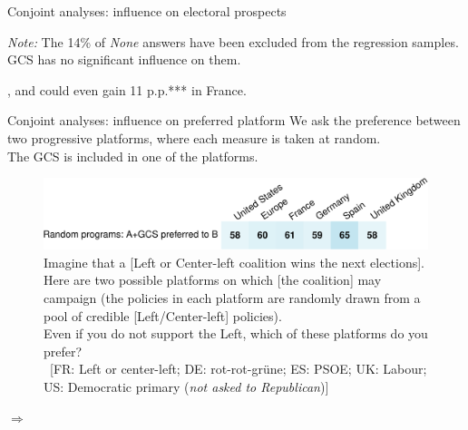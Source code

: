 \documentclass[aspectratio=169,xcolor=dvipsnames, 11pt,mathserif]{beamer}
\begin{document}
\begin{framefont}{\small}
\begin{frame}{Conjoint analyses: influence on electoral prospects\label{conjoint_c}}
{\begin{table}[h]
        \makebox[\textwidth][c]{}
        {\footnotesize \textit{Note:} The 14\% of \textit{None} answers have been excluded from the regression samples. GCS has no significant influence on them. }
      \end{table} \vspace*{-.2cm}
      \bbvs \ip {}, and could even gain 11 p.p.*** in France.
      \ee
      }
\end{frame}

\begin{frame}{Conjoint analyses: influence on preferred platform\label{conjoint_d}} 
    \bbvs \ip We ask the preference between two progressive platforms, where each measure is taken at random. \\ The GCS is included in one of the platforms.
    \ee
    \begin{figure} \vspace*{-.3cm}
        \centering 
        \caption{Imagine that a [Left or Center-left coalition wins the next elections]. Here are two possible platforms on which [the coalition] may campaign (the policies in each platform are randomly drawn from a pool of credible [Left/Center-left] policies).
		\\ Even if you do not support the Left, which of these platforms do you prefer? 
		\\ ~[FR: Left or center-left; DE: rot-rot-grüne; ES: PSOE; UK: Labour; US: Democratic primary (\textit{not asked to Republican})]
		}
        \vspace{-.2cm} 
        \includegraphics[width=\textwidth]{../figures/country_comparison/conjoint_left_ag_b_binary_positive.pdf} 
    \end{figure}
    $\Rightarrow$ 
\end{frame}


\end{framefont}
\end{document}
